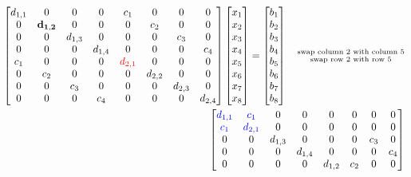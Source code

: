 \documentclass{article}
\begin{document}
\begin{align*}
\begin{bmatrix}
        d_{1,1} & 0 & 0 & 0 & c_{1} & 0 & 0 & 0 \\
        0 & \mathbf{d_{1,2}} & 0 & 0 & 0 & c_{2} & 0 & 0 \\
         0 & 0& d_{1,3} & 0 & 0 &0 & c_{3} & 0\\
        0 & 0& 0 & d_{1,4} & 0 & 0 & 0 & c_{4} \\
        c_{1} & 0& 0 &0& \color{red}d_{2,1}\color{black}&0 & 0 & 0 \\
        0 & c_{2} & 0 & 0& 0 & d_{2,2} & 0 & 0 \\
        0 & 0& c_{3} & 0 & 0 & 0 & d_{2,3} & 0 \\
        0 & 0 & 0 &c_{4} & 0 & 0 & 0 & d_{2,4}
    \end{bmatrix}\begin{bmatrix}
        x_{1} \\ x_{2} \\ x_{3} \\ x_{4} \\ x_{5} \\ x_{6} \\ x_{7} \\ x_{8}
    \end{bmatrix} = \begin{bmatrix}
        b_{1} \\ b_{2} \\ b_{3} \\ b_{4} \\ b_{5} \\ b_{6} \\ b_{7} \\ b_{8}
    \end{bmatrix} \quad \substack{\text{swap column $2$ with column $5$} \\
                                  \text{swap row $2$ with row $5$}} \\
    \begin{bmatrix}
        \color{blue}d_{1,1}\color{black} & \color{blue}c_{1}\color{black} & 0 & 0 & 0 & 0 & 0 & 0 \\
        \color{blue}c_{1}\color{black} & \color{blue}d_{2,1}\color{black}& 0 &0& 0&0 & 0 & 0 \\
         0 & 0& d_{1,3} & 0 & 0 &0 & c_{3} & 0\\
        0 & 0& 0 & d_{1,4} & 0 & 0 & 0 & c_{4} \\
         0 & 0 & 0 & 0 & d_{1,2} & c_{2} & 0 & 0 \\

\end{bmatrix}
\end{align*}
\end{document}

